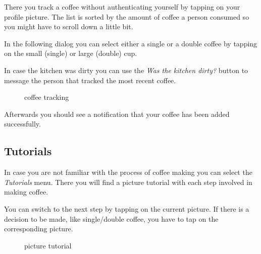 There you track a coffee without authenticating yourself by tapping on
your profile picture. The list is sorted by the amount of coffee a
person consumed so you might have to scroll down a little bit.

In the following dialog you can select either a single or a double
coffee by tapping on the small (single) or large (double) cup.

In case the kitchen was dirty you can use the \emph{Was the kitchen
dirty?} button to message the person that tracked the most recent
coffee.

\begin{figure}[htbp]
\centering
{}
\caption{coffee tracking}
\end{figure}

Afterwards you should see a notification that your coffee has been added
successfully.

\subsection{Tutorials}\label{tutorials-1}

In case you are not familiar with the process of coffee making you can
select the \emph{Tutorials} menu. There you will find a picture tutorial
with each step involved in making coffee.

You can switch to the next step by tapping on the current picture. If
there is a decision to be made, like single/double coffee, you have to
tap on the corresponding picture.

\begin{figure}[htbp]
\centering
{}
\caption{picture tutorial}
\end{figure}

